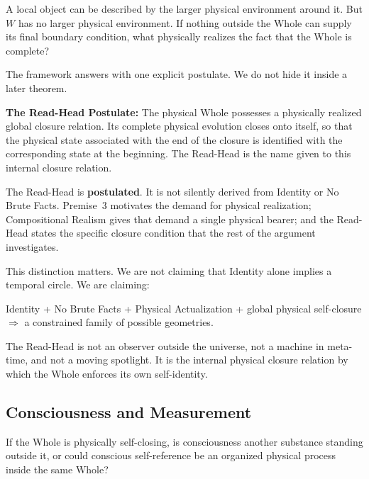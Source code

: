 \documentclass[11pt]{article}
\theoremstyle{canonstyle}
\begin{document}
\begin{reflect}
A local object can be described by the larger physical environment around it. But $W$ has no larger physical environment. If nothing outside the Whole can supply its final boundary condition, what physically realizes the fact that the Whole is complete?
\end{reflect}

The framework answers with one explicit postulate. We do not hide it inside a later theorem.

\begin{keyresult}
\textbf{The Read-Head Postulate:} The physical Whole possesses a physically realized global closure relation. Its complete physical evolution closes onto itself, so that the physical state associated with the end of the closure is identified with the corresponding state at the beginning. The Read-Head is the name given to this internal closure relation.
\end{keyresult}

The Read-Head is \textbf{postulated}. It is not silently derived from Identity or No Brute Facts. Premise~3 motivates the demand for physical realization; Compositional Realism gives that demand a single physical bearer; and the Read-Head states the specific closure condition that the rest of the argument investigates.

This distinction matters. We are not claiming that Identity alone implies a temporal circle. We are claiming:
\begin{center}
Identity + No Brute Facts + Physical Actualization + global physical self-closure\\ $\Longrightarrow$ a constrained family of possible geometries.
\end{center}

The Read-Head is not an observer outside the universe, not a machine in meta-time, and not a moving spotlight. It is the internal physical closure relation by which the Whole enforces its own self-identity.

\subsection{Consciousness and Measurement}

\begin{reflect}
If the Whole is physically self-closing, is consciousness another substance standing outside it, or could conscious self-reference be an organized physical process inside the same Whole?
\end{reflect}
\end{document}
